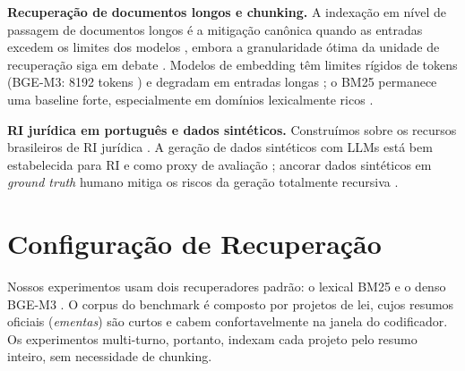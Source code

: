 \documentclass[conference]{IEEEtran}
\begin{document}
\textbf{Recuperação de documentos longos e chunking.} A indexação em nível de
passagem de documentos longos é a mitigação canônica quando as entradas excedem
os limites dos modelos \cite{Dai2019Deeper,Karpukhin2020DPR}, embora a
granularidade ótima da unidade de recuperação siga em debate
\cite{Jiang2024LongRAG}. Modelos de embedding têm limites rígidos de tokens
(BGE-M3: 8192 tokens \cite{Chen2024BGEM3}) e degradam em entradas longas
\cite{Zhou2024LengthCollapse}; o BM25 permanece uma baseline forte,
especialmente em domínios lexicalmente ricos \cite{Robertson2009BM25,Thakur2021BEIR}.

\textbf{RI jurídica em português e dados sintéticos.} Construímos sobre os
recursos brasileiros de RI jurídica
\cite{Vitorio2024,Fernandes2026JurisTCU,Pereira2026JUA,Junior2025BRTaxQA,LuzdeAraujo2018LeNERBr}.
A geração de dados sintéticos com LLMs está bem estabelecida para RI
\cite{Bonifacio2022InPars,Dai2023Promptagator} e como proxy de avaliação
\cite{Chiang2023Can}; ancorar dados sintéticos em \emph{ground truth} humano
mitiga os riscos da geração totalmente recursiva \cite{Shumailov2024Collapse}.

\section{Configuração de Recuperação}
\label{sec:foundation}
Nossos experimentos usam dois recuperadores padrão: o lexical BM25
\cite{Robertson2009BM25} e o denso BGE-M3 \cite{Chen2024BGEM3}. O corpus do
benchmark é composto por projetos de lei, cujos resumos oficiais
(\emph{ementas}) são curtos e cabem confortavelmente na janela do codificador.
Os experimentos multi-turno, portanto, indexam cada projeto pelo resumo
inteiro, sem necessidade de chunking.
\end{document}
